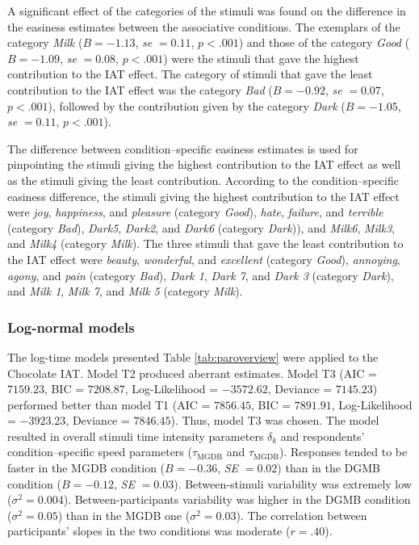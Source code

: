 \documentclass[12pt]{book}
\begin{document}
A significant effect of the categories of the stimuli was found on the difference in the easiness estimates between the associative conditions. 
The exemplars of the category \emph{Milk} ($B = -1.13$, \emph{se} $= 0.11$, $p<.001$) and those of the category \emph{Good} ($B = -1.09$, \emph{se} $= 0.08$, $p<.001$) were the stimuli that gave the highest contribution to the IAT effect.  
The category of stimuli that gave the least contribution to the IAT effect was the category \emph{Bad} ($B = -0.92$, \emph{se} $= 0.07$, $p<.001$), followed by the contribution given by the category \emph{Dark} ($B = -1.05$, \emph{se} $= 0.11$, $p<.001$).

The difference between condition--specific easiness estimates is used for pinpointing the stimuli giving the highest contribution to the IAT effect as well as the stimuli giving the least contribution. According to the condition--specific easiness difference, the stimuli giving the highest contribution to the IAT effect were \emph{joy},  \emph{happiness}, and \emph{pleasure} (category \emph{Good}), \emph{hate},  \emph{failure}, and \emph{terrible} (category \emph{Bad}), \emph{Dark5}, \emph{Dark2}, and \emph{Dark6} (category \emph{Dark})), and \emph{Milk6}, \emph{Milk3}, and \emph{Milk4} (category \emph{Milk}). 
The three stimuli that gave the least contribution to the IAT effect were \emph{beauty}, \emph{wonderful}, and \emph{excellent} (category \emph{Good}), \emph{annoying}, \emph{agony}, and \emph{pain} (category \emph{Bad}), \emph{Dark 1}, \emph{Dark 7}, and \emph{Dark 3} (category \emph{Dark}), and \emph{Milk 1}, \emph{Milk 7}, and \emph{Milk 5} (category \emph{Milk}).


\subsubsection{Log-normal models}

The log-time models presented Table \ref{tab:paroverview} were applied to the Chocolate IAT.
Model T2 produced aberrant estimates. Model T3 (AIC = $7159.23$, BIC = $7208.87$, Log-Likelihood = $-3572.62$, Deviance = $7145.23$) performed better than model T1 (AIC = $7856.45$, BIC = $7891.91$, Log-Likelihood = $-3923.23$, Deviance = $7846.45$). Thus, model T3 was chosen. The model resulted in overall stimuli time intensity parameters $\delta_k$ and respondents' condition--specific speed parameters ($\tau_{\text{MGDB}}$ and $\tau_{\text{MGDB}}$).
Responses tended to be faster in the MGDB condition ($B = -0.36$, \emph{SE} $= 0.02$) than in the DGMB condition ($B = -0.12$, \emph{SE} $= 0.03$). Between-stimuli variability was extremely low ($\sigma^2 = 0.004$). Between-participants variability was higher in the DGMB condition ($\sigma^2 = 0.05$) than in the MGDB one ($\sigma^2 = 0.03$). 
The correlation between participants' slopes in the two conditions was moderate ($r = .40$).
\end{document}
